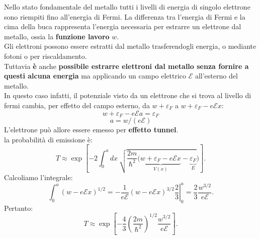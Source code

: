 \documentclass[a4paper,11pt,oneside]{book}
\begin{document}
Nello stato fondamentale del metallo tutti i livelli di energia di singolo elettrone sono riempiti fino all'energia di Fermi. La differenza tra l'energia di Fermi e la cima della buca rappresenta l'energia necessaria per estrarre un elettrone dal metallo, ossia la \textbf{funzione lavoro} $w$.\\
Gli elettroni possono essere estratti dal metallo trasferendogli energia, o mediante fotoni o per riscaldamento.\\
Tuttavia \textbf{è} anche \textbf{possibile estrarre elettroni dal metallo senza fornire a questi alcuna energia} ma applicando un campo elettrico $\mathscr{E}$ all'esterno del metallo.\\
In questo caso infatti, il potenziale visto da un elettrone che si trova al livello di fermi cambia, per effetto del campo esterno, da $w+\varepsilon _F$ a $w+\varepsilon _F-e\mathscr{E}x$:
\[w+\varepsilon _F-e\mathscr{E}a=\varepsilon _F\]
\[a= w/(e\mathscr{E})\]
L'elettrone può allore essere emesso per \textbf{effetto tunnel}.\\
la probabilità di emissione è:
\begin{equation}
T \approx \exp \left[-2 \int_{0} ^{a} dx\ \sqrt{\frac{2m}{\hbar ^2} (\underbrace{w+\varepsilon _F-e\mathscr{E}x}_{V(x)}-\underbrace{\varepsilon _F}_{E}})\right].
\end{equation}
Calcoliamo l'integrale:
\begin{equation}
\int _{0} ^{a} \left( w-e\mathscr{E}x \right) ^{1/2}= \left. -\frac{1}{e\mathscr{E}}\left( w-e\mathscr{E}x \right) ^{3/2}\frac{2}{3}\right| _0 ^a =\frac{2}{3}\frac{w^{3/2}}{e\mathscr{E}}.
\end{equation}
Pertanto:
\begin{equation}
T \approx \exp \left[-\frac{4}{3}\left(\frac{2m}{\hbar ^2}\right)^{1/2}\frac{w^{3/2}}{e\mathscr{E}}\right].
\end{equation}
\end{document}
